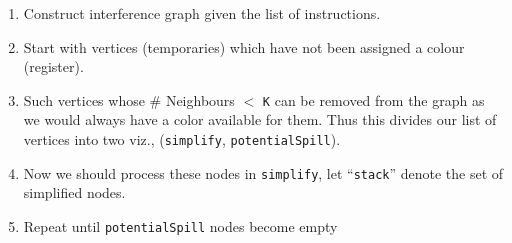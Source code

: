 \begin{enumerate}
\def\labelenumi{\arabic{enumi}.}
\item
  Construct interference graph given the list of instructions.
\item
  Start with vertices (temporaries) which have not been assigned a
  colour (register).
\item
  Such vertices whose \# Neighbours \(<\)
  \texttt{K} can
  be removed from the graph as we would always have a color available
  for them. Thus this divides our list of vertices into two viz.,
  (\texttt{simplify},
  \texttt{potentialSpill}).
\item
  Now we should process these nodes in
  \texttt{simplify},
  let
  ``\texttt{stack}''
  denote the set of simplified nodes.
\item
  Repeat until
  \texttt{potentialSpill}
  nodes become empty


\end{enumerate}
